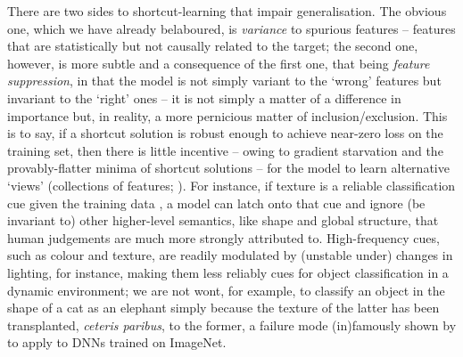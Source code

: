 There are two sides to shortcut-learning that impair generalisation.
%
The obvious one, which we have already belaboured, is \emph{variance} to spurious features --
features that are statistically but not causally related to the target; the second one, however, is
more subtle and a consequence of the first one, that being \emph{feature suppression}, in that the
model is not simply variant to the `wrong' features but invariant to the `right' ones -- it is not
simply a matter of a difference in importance but, in reality, a more pernicious matter of
inclusion/exclusion.
%
This is to say, if a shortcut solution is robust enough to achieve near-zero loss on the training
set, then there is little incentive -- owing to gradient starvation \citep{pezeshki2021gradient}
and the provably-flatter minima of shortcut solutions \citep{scimeca2021shortcut} -- for the model
to learn alternative `views' (collections of features; \cite{allen2020towards}).
%
For instance, if texture is a reliable classification cue given the training data
\cite{geirhos2018imagenet}, a model can latch onto that cue and ignore (be invariant to) other
higher-level semantics, like shape and global structure, that human judgements are much more
strongly attributed to.
%
High-frequency cues, such as colour and texture, are readily modulated by (unstable under) changes
in lighting, for instance, making them less reliably cues for object classification in a dynamic
environment; we are not wont, for example, to classify an object in the shape of a cat as an
elephant simply because the texture of the latter has been transplanted, \emph{ceteris paribus}, to
the former, a failure mode (in)famously shown by \cite{geirhos2018imagenet} to apply to DNNs
trained on ImageNet.

